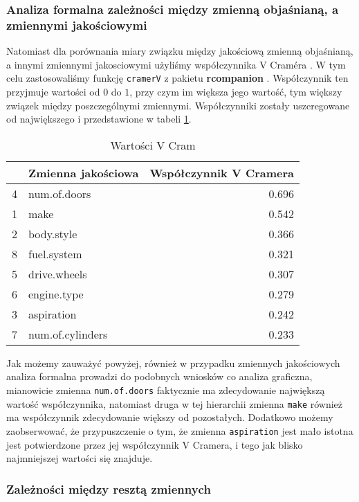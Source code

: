 \documentclass[12pt, a4paper]{article}\usepackage[]{graphicx}\usepackage[]{xcolor}
\begin{document}
\subsubsection{Analiza formalna zależności między zmienną objaśnianą, a zmiennymi jakościowymi}

Natomiast dla porównania miary związku między jakościową zmienną objaśnianą, a innymi zmiennymi jakosciowymi użyliśmy współczynnika V Craméra \cite{cramerV}. W tym celu zastosowaliśmy funkcję \texttt{cramerV} z pakietu \textbf{rcompanion} \cite{cramerVR}. Współczynnik ten przyjmuje wartości od $0$ do $1$, przy czym im większa jego wartość, tym większy związek między poszczególnymi zmiennymi. Współczynniki zostały uszeregowane od największego i przedstawione w tabeli \ref{tab:VCram}.

\begin{table}[H]
\centering
\begin{tabular}{rlr}
  \hline
 & Zmienna jakościowa & Współczynnik V Cramera \\ 
  \hline
4 & num.of.doors & 0.696 \\ 
  1 & make & 0.542 \\ 
  2 & body.style & 0.366 \\ 
  8 & fuel.system & 0.321 \\ 
  5 & drive.wheels & 0.307 \\ 
  6 & engine.type & 0.279 \\ 
  3 & aspiration & 0.242 \\ 
  7 & num.of.cylinders & 0.233 \\ 
   \hline
\end{tabular}
\caption{Wartości V Cram} 
\label{tab:VCram}
\end{table}

Jak możemy zauważyć powyżej, również w przypadku zmiennych jakościowych analiza formalna prowadzi do podobnych wniosków co analiza graficzna, mianowicie zmienna \texttt{num.of.doors} faktycznie ma zdecydowanie największą wartość współczynnika, natomiast druga w tej hierarchii zmienna \texttt{make} również ma współczynnik zdecydowanie większy od pozostałych. Dodatkowo możemy zaobserwować, że przypuszczenie o tym, że zmienna \texttt{aspiration} jest mało istotna jest potwierdzone przez jej współczynnik V Cramera, i tego jak blisko najmniejszej wartości się znajduje.

\subsubsection{Zależności między resztą zmiennych}
\end{document}
